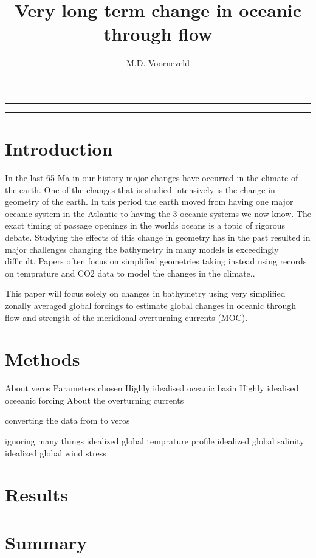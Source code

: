 \documentclass[a4paper]{article}
\title{Very long term change in oceanic through flow}
\author{M.D. Voorneveld}
\begin{document}
\maketitle
\noindent\rule{\textwidth}{1pt}
\begin{abstract}

\end{abstract}
\noindent\rule{\textwidth}{1pt}
\begin{multicols}{2}
\section{Introduction}

In the last 65 Ma in our history major changes have occurred in the climate of the earth. One of the changes that is studied intensively is the change in geometry of the earth. In this period the earth moved from having one major oceanic system in the Atlantic to having the 3 oceanic systems we now know. The exact timing of passage openings in the worlds oceans is a topic of rigorous debate\cite{Scher2006Apr}\cite{Schmidt2007Jan}. Studying the effects of this change in geometry has in the past resulted in major challenges changing the bathymetry in many models is exceedingly difficult. Papers often focus on simplified geometries taking instead using records on temprature and CO2 data to model the changes in the climate.\cite{Tigchelaar2011Mar}.

This paper will focus solely on changes in bathymetry using very simplified zonally averaged global forcings to estimate global changes in oceanic through flow and strength of the meridional overturning currents (MOC).

\section{Methods}

About veros
Parameters chosen
Highly idealised oceanic basin
Highly idealised oceeanic forcing
About the overturning currents

converting the data from \cite{Muller2008Mar} to veros

ignoring many things
idealized global temprature profile
idealized global salinity
idealized global wind stress


\section{Results}

\section{Summary}

\printbibliography

\end{multicols}
\end{document}
